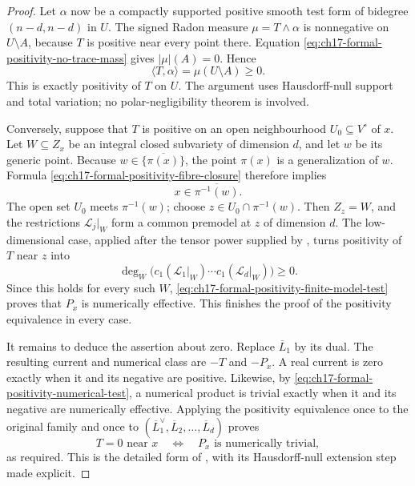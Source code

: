 \begin{proof}
Let $\alpha$ now be a compactly supported positive smooth test form of
bidegree $(n-d,n-d)$ in $U$.  The signed Radon measure
$\mu=T\wedge\alpha$ is nonnegative on $U\setminus A$, because $T$ is
positive near every point there.  Equation
\eqref{eq:ch17-formal-positivity-no-trace-mass} gives
$|\mu|(A)=0$.  Hence
\[
                         \langle T,\alpha\rangle
                         =\mu(U\setminus A)\geq0.
\]
This is exactly positivity of $T$ on $U$.  The argument uses
Hausdorff-null support and total variation; no polar-negligibility theorem
is involved.

Conversely, suppose that $T$ is positive on an open neighbourhood
$U_0\subseteq V^\circ$ of $x$.  Let $W\subseteq Z_x$ be an integral
closed subvariety of dimension $d$, and let $w$ be its generic point.
Because $w\in\overline{\{\pi(x)\}}$, the point $\pi(x)$ is a
generalization of $w$.  Formula
\eqref{eq:ch17-formal-positivity-fibre-closure} therefore implies
\[
                         x\in\overline{\pi^{-1}(w)}.
\]
The open set $U_0$ meets $\pi^{-1}(w)$; choose
$z\in U_0\cap\pi^{-1}(w)$.  Then $Z_z=W$, and the restrictions
$\mathscr L_j|_W$ form a common premodel at $z$ of dimension $d$.
The low-dimensional case, applied after the tensor power supplied by
\cite[Proposition~17.6.4]{CLD25}, turns positivity of $T$ near $z$
into
\[
 \deg_W\bigl(c_1(\mathscr L_1|_W)\cdots
                  c_1(\mathscr L_d|_W)\bigr)\geq0.
\]
Since this holds for every such $W$,
\eqref{eq:ch17-formal-positivity-finite-model-test} proves that $P_x$ is
numerically effective.  This finishes the proof of the positivity
equivalence in every case.

It remains to deduce the assertion about zero.  Replace
$\overline L_1$ by its dual.  The resulting current and numerical class
are $-T$ and $-P_x$.  A real current is zero exactly when it and its
negative are positive.  Likewise, by
\eqref{eq:ch17-formal-positivity-numerical-test}, a numerical product is
trivial exactly when it and its negative are numerically effective.
Applying the positivity equivalence once to the original family and once
to
$(\overline L_1^\vee,\overline L_2,\ldots,\overline L_d)$ proves
\[
              T=0\text{ near }x
              \quad\Longleftrightarrow\quad
              P_x\text{ is numerically trivial},
\]
as required.  This is the detailed form of
\cite[Theorem~18.8.4]{CLD25}, with its Hausdorff-null extension step made
explicit.
\end{proof}

